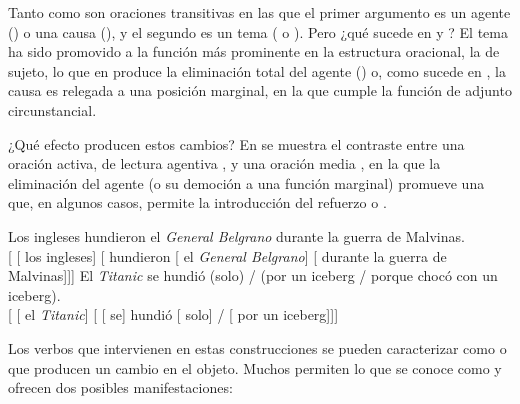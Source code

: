 Tanto  como  son oraciones transitivas
en las que el primer argumento es un agente () o una causa
(), y el segundo es un tema ( o ). Pero ¿qué sucede en  y ? El tema
ha sido promovido a la función más prominente en la estructura oracional, la de
sujeto, lo que en  produce la eliminación total del agente
() o, como sucede en
, la causa es relegada a una posición marginal, en la que
cumple la función de adjunto circunstancial.

¿Qué efecto producen estos cambios? En  se muestra el
contraste entre una oración activa, de lectura agentiva ,
y una oración media , en la que la eliminación del agente
(o su democión a una función marginal) promueve una 
que, en algunos casos, permite la introducción del refuerzo  o
.

\begin{exe}
  \ex\label{ex:10-belgrano}
    \begin{xlist}
      \ex\label{ex:10-belgrano-a} Los ingleses hundieron el \textit{General
          Belgrano} durante la guerra de Malvinas.\\
          {}[ [ los ingleses] [
          hundieron [ el \textit{General Belgrano}]
          [ durante la guerra de Malvinas]]]
      \ex\label{ex:10-belgrano-b} El \textit{Titanic} se hundió (solo) / (por un
          iceberg / porque chocó con un iceberg).\\
          {}[ [ el \textit{Titanic}] [
          [ se] hundió [ solo] / [
          por un iceberg]]]
    \end{xlist}
\end{exe}

Los verbos que intervienen en estas construcciones se pueden caracterizar como
 o que producen un cambio en el objeto. Muchos permiten lo
que se conoce como  y ofrecen dos posibles
manifestaciones:

